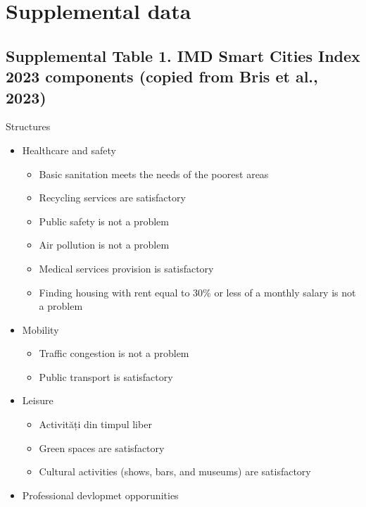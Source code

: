 \documentclass[
  english,
  12pt,
  a4paper,
]{scrartcl}
\providecommand{\tightlist}{%
  \setlength{\itemsep}{0pt}\setlength{\parskip}{0pt}}
\begin{document}
\appendix

\section{Supplemental data}\label{supplemental-data}

\subsection{Supplemental Table 1. IMD Smart Cities Index 2023 components
(copied from Bris et al.,
2023)}\label{supplemental-table-1.-imd-smart-cities-index-2023-components-copied-from-bris-et-al.-2023}

Structures

\begin{itemize}
\tightlist
\item
  Healthcare and safety

  \begin{itemize}
  \tightlist
  \item
    Basic sanitation meets the needs of the poorest areas
  \item
    Recycling services are satisfactory
  \item
    Public safety is not a problem
  \item
    Air pollution is not a problem
  \item
    Medical services provision is satisfactory
  \item
    Finding housing with rent equal to 30\% or less of a monthly salary
    is not a problem
  \end{itemize}
\item
  Mobility

  \begin{itemize}
  \tightlist
  \item
    Traffic congestion is not a problem
  \item
    Public transport is satisfactory
  \end{itemize}
\item
  Leisure

  \begin{itemize}
  \tightlist
  \item
    Activități din timpul liber
  \item
    Green spaces are satisfactory
  \item
    Cultural activities (shows, bars, and museums) are satisfactory
  \end{itemize}
\item
  Professional devlopmet opporunities


\end{itemize}
\end{document}
